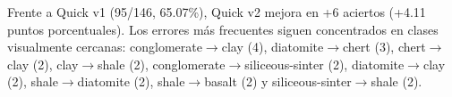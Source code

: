 Frente a Quick v1 (95/146, 65.07\%), Quick v2 mejora en +6 aciertos (+4.11 puntos
porcentuales). Los errores más frecuentes siguen concentrados en clases visualmente
cercanas: conglomerate$\rightarrow$clay (4), diatomite$\rightarrow$chert (3),
chert$\rightarrow$clay (2), clay$\rightarrow$shale (2),
conglomerate$\rightarrow$siliceous-sinter (2), diatomite$\rightarrow$clay (2),
shale$\rightarrow$diatomite (2), shale$\rightarrow$basalt (2) y
siliceous-sinter$\rightarrow$shale (2).
